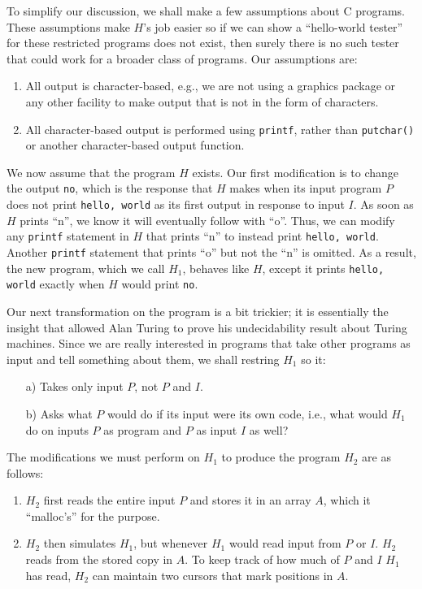 \documentclass[]{article}
\begin{document}
To simplify our discussion, we shall make a few assumptions about C 
programs. These assumptions make $H$'s job easier so if we can show a
``hello-world tester'' for these restricted programs does not exist, then
surely there is no such tester that could work for a broader class of 
programs. Our assumptions are:
\begin{enumerate}
\item All output is character-based, e.g., we are not using a graphics
package or any other facility to make output that is not in the form of
characters.
\item All character-based output is performed using \texttt{printf},
rather than \texttt{putchar()} or another character-based output 
function. 
\end{enumerate}

We now assume that the program $H$ exists. Our first modification is to 
change the output \texttt{no}, which is the response that $H$ makes when
its input program $P$ does not print \texttt{hello, world} as its first 
output in response to input $I$. As soon as $H$ prints ``n'', we know it 
will eventually follow with ``o''. Thus, we can modify any \texttt{printf}
statement in $H$ that prints ``n'' to instead print \texttt{hello, world}.
Another \texttt{printf} statement that prints ``o'' but not the ``n'' is
omitted. As a result, the new program, which we call $H_1$, behaves like 
$H$, except it prints \texttt{hello, world} exactly when $H$ would print
\texttt{no}.

Our next transformation on the program is a bit trickier; it is essentially
the insight that allowed Alan Turing to prove his undecidability result 
about Turing machines. Since we are really interested in programs that take
other programs as input and tell something about them, we shall restring
$H_1$ so it:
\begin{enumerate}
\item[a)] Takes only input $P$, not $P$ and $I$.
\item[b)] Asks what $P$ would do if its input were its own code, i.e.,
what would $H_1$ do on inputs $P$ as program and $P$ as input $I$ as 
well?
\end{enumerate}

The modifications we must perform on $H_1$ to produce the program $H_2$ are
as follows:
\begin{enumerate}
\item $H_2$ first reads the entire input $P$ and stores it in an array
$A$, which it ``malloc's'' for the purpose.
\item $H_2$ then simulates $H_1$, but whenever $H_1$ would read input 
from $P$ or $I$. $H_2$ reads from the stored copy in $A$. To keep track 
of how much of $P$ and $I$ $H_1$ has read, $H_2$ can maintain two
cursors that mark positions in $A$.
\end{enumerate}
\end{document}
